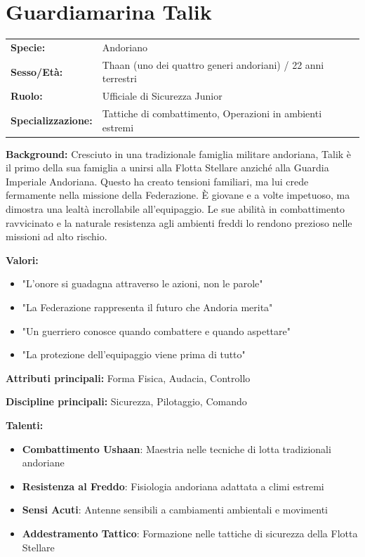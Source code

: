 \documentclass[11pt,a4paper]{article}
\begin{document}
\section{Guardiamarina Talik}

\begin{tcolorbox}[colback=fedlightblue!10, colframe=fedblue]
\begin{tabularx}{\textwidth}{lX}
\textbf{Specie:} & Andoriano \\
\textbf{Sesso/Età:} & Thaan (uno dei quattro generi andoriani) / 22 anni terrestri \\
\textbf{Ruolo:} & Ufficiale di Sicurezza Junior \\
\textbf{Specializzazione:} & Tattiche di combattimento, Operazioni in ambienti estremi \\
\end{tabularx}

\textbf{Background:} Cresciuto in una tradizionale famiglia militare andoriana, Talik è il primo della sua famiglia a unirsi alla Flotta Stellare anziché alla Guardia Imperiale Andoriana. Questo ha creato tensioni familiari, ma lui crede fermamente nella missione della Federazione. È giovane e a volte impetuoso, ma dimostra una lealtà incrollabile all'equipaggio. Le sue abilità in combattimento ravvicinato e la naturale resistenza agli ambienti freddi lo rendono prezioso nelle missioni ad alto rischio.

\textbf{Valori:}
\begin{itemize}[leftmargin=*]
\item "L'onore si guadagna attraverso le azioni, non le parole"
\item "La Federazione rappresenta il futuro che Andoria merita"
\item "Un guerriero conosce quando combattere e quando aspettare"
\item "La protezione dell'equipaggio viene prima di tutto"
\end{itemize}

\textbf{Attributi principali:} Forma Fisica, Audacia, Controllo

\textbf{Discipline principali:} Sicurezza, Pilotaggio, Comando

\textbf{Talenti:}
\begin{itemize}[leftmargin=*]
\item \textbf{Combattimento Ushaan}: Maestria nelle tecniche di lotta tradizionali andoriane
\item \textbf{Resistenza al Freddo}: Fisiologia andoriana adattata a climi estremi
\item \textbf{Sensi Acuti}: Antenne sensibili a cambiamenti ambientali e movimenti
\item \textbf{Addestramento Tattico}: Formazione nelle tattiche di sicurezza della Flotta Stellare
\end{itemize}
\end{tcolorbox}
\end{document}
